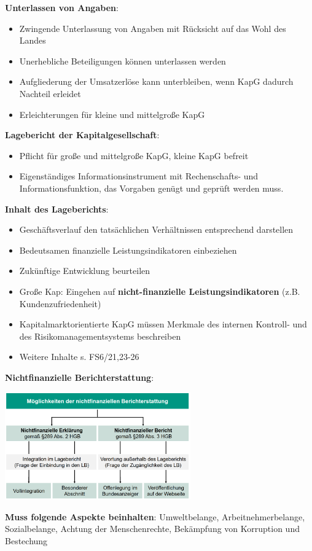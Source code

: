 \textbf{Unterlassen von Angaben}:
\begin{itemize}
	\item Zwingende Unterlassung von Angaben mit Rücksicht auf das Wohl des Landes
	\item Unerhebliche Beteiligungen können unterlassen werden
	\item Aufgliederung der Umsatzerlöse kann unterbleiben, wenn KapG dadurch Nachteil erleidet
	\item Erleichterungen für kleine und mittelgroße KapG
\end{itemize}
\bigskip
\textbf{Lagebericht der Kapitalgesellschaft}:
\begin{itemize}
	\item Pflicht für große und mittelgroße KapG, kleine KapG befreit
	\item Eigenständiges Informationsinstrument mit Rechenschafts- und Informationsfunktion, das Vorgaben genügt und geprüft werden muss.
\end{itemize}

\textbf{Inhalt des Lageberichts}:
\begin{itemize}
	\item Geschäftsverlauf den tatsächlichen Verhältnissen entsprechend darstellen
	\item Bedeutsamen finanzielle Leistungsindikatoren einbeziehen
	\item Zukünftige Entwicklung beurteilen
	\item Große Kap: Eingehen auf \textbf{nicht-finanzielle Leistungsindikatoren} (z.B. Kundenzufriedenheit)
	\item Kapitalmarktorientierte KapG müssen Merkmale des internen Kontroll- und des Risikomanagementsystems beschreiben
	\item Weitere Inhalte s. FS6/21,23-26
\end{itemize}

\textbf{Nichtfinanzielle Berichterstattung}:
\begin{center}
	\includegraphics[width=0.6\textwidth]{images/nfb.png}
\end{center}
\textbf{Muss folgende Aspekte beinhalten}: Umweltbelange, Arbeitnehmerbelange, Sozialbelange, Achtung der Menschenrechte, Bekämpfung von Korruption und Bestechung\\
 
